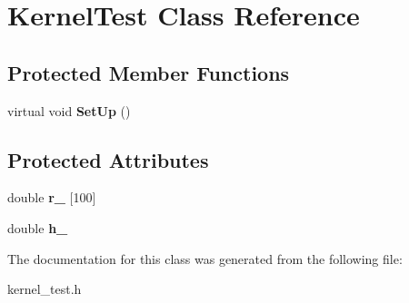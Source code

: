 \hypertarget{classKernelTest}{\section{\-Kernel\-Test \-Class \-Reference}
\label{classKernelTest}
}
\subsection*{\-Protected \-Member \-Functions}
\begin{DoxyCompactItemize}
\item 
\hypertarget{classKernelTest_a47b4dee38e08baa035bfce315271fd6c}{virtual void {\bfseries \-Set\-Up} ()}\label{classKernelTest_a47b4dee38e08baa035bfce315271fd6c}

\end{DoxyCompactItemize}
\subsection*{\-Protected \-Attributes}
\begin{DoxyCompactItemize}
\item 
\hypertarget{classKernelTest_a507e12d1d97028ae7b512e600bdb7c0a}{double {\bfseries r\-\_\-} \mbox{[}100\mbox{]}}\label{classKernelTest_a507e12d1d97028ae7b512e600bdb7c0a}

\item 
\hypertarget{classKernelTest_ac5cb515f7fd83bbf8b28305df952d73d}{double {\bfseries h\-\_\-}}\label{classKernelTest_ac5cb515f7fd83bbf8b28305df952d73d}

\end{DoxyCompactItemize}


\-The documentation for this class was generated from the following file\-:\begin{DoxyCompactItemize}
\item 
kernel\-\_\-test.\-h\end{DoxyCompactItemize}

